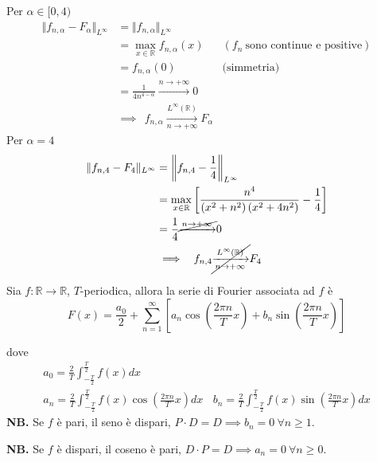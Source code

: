 \begin{enumerate}
Per $\alpha \in [ 0,4)$\begin{equation*}
\begin{aligned}
\Vert f_{n,\alpha } -F_{\alpha }\Vert _{L^{\infty }} & =\Vert f_{n,\alpha }\Vert _{L^{\infty }} & \\
 & =\max_{x\in \mathbb{R}} f_{n,\alpha }( x) & \left( f_{n} \ \text{sono continue e positive}\right)\\
 & =f_{n,\alpha }( 0) & \text{(simmetria)}\\
 & =\frac{1}{4n^{4-\alpha }}\xrightarrow{n\rightarrow +\infty } 0 & \\
 & \implies \ \ f_{n,\alpha }\xrightarrow[n\rightarrow +\infty ]{L^{\infty }(\mathbb{R})} F_{\alpha } & 
\end{aligned}
\end{equation*}Per $\alpha =4$\begin{equation*}
\begin{aligned}
\Vert f_{n,4} -F_{4}\Vert _{L^{\infty }} & =\left\Vert f_{n,4} -\frac{1}{4}\right\Vert _{L^{\infty }}\\
 & =\max_{x\in \mathbb{R}}\left[\frac{n^{4}}{\left( x^{2} +n^{2}\right)\left( x^{2} +4n^{2}\right)} -\frac{1}{4}\right]\\
 & =\frac{1}{4}\cancel{\xrightarrow{n\rightarrow +\infty }} 0\\
 & \implies \ \ f_{n,4}\cancel{\xrightarrow[n\rightarrow +\infty ]{L^{\infty }(\mathbb{R})}} F_{4}
\end{aligned}
\end{equation*}
\end{enumerate}
\Soluzione
\begin{thm}
Sia $f:\mathbb{R}\rightarrow \mathbb{R}$, $T$-periodica, allora la serie di Fourier associata ad $f$ è\begin{equation*}
F( x) =\frac{a_{0}}{2} +\sum\limits ^{\infty }_{n=1}\left[ a_{n}\cos\left(\frac{2\pi n}{T} x\right) +b_{n}\sin\left(\frac{2\pi n}{T} x\right)\right]
\end{equation*}

dove
\begin{gather*}
a_{0} =\frac{2}{T}\int ^{\frac{T}{2}}_{-\frac{T}{2}} f( x) dx\\
a_{n} =\frac{2}{T}\int ^{\frac{T}{2}}_{-\frac{T}{2}} f( x)\cos\left(\frac{2\pi n}{T} x\right) dx\ \ \ \ b_{n} =\frac{2}{T}\int ^{\frac{T}{2}}_{-\frac{T}{2}} f( x)\sin\left(\frac{2\pi n}{T} x\right) dx
\end{gather*}
\textbf{NB.} Se $f$ è pari, il seno è dispari, $P\cdotp D=D\implies b_{n} =0\ \forall n\geqslant 1$.

\textbf{NB.} Se $f$ è dispari, il coseno è pari, $D\cdotp P=D\implies a_{n} =0\ \forall n\geqslant 0$.
\end{thm}
